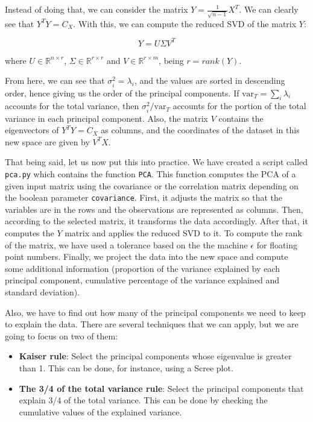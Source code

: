 \documentclass[11pt,a4paper]{article}
\begin{document}
Instead of doing that, we can consider the matrix $Y = \frac{1}{\sqrt{n-1}}X^T$. We can clearly see that
$Y^T Y = C_X$. With this, we can compute the reduced SVD of the matrix $Y$:

\[
  Y = U \Sigma V^T
\]

where $U \in \mathbb{R}^{n \times r}$, $\Sigma \in \mathbb{R}^{r \times r}$ and $V \in \mathbb{R}^{r \times m}$,
being $r = rank(Y)$.

From here, we can see that $\sigma_i^2 = \lambda_i$, and the values are sorted in descending order, hence giving
us the order of the principal components. If $\text{var}_T = \sum_i \lambda_i$ accounts for the total variance,
then $\sigma_i^2 / \text{var}_T$ accounts for the portion of the total variance in each principal component.
Also, the matrix $V$ contains the eigenvectors of $Y^T Y = C_X$ as columns, and the coordinates of the dataset
in this new space are given by $V^T X$.

That being said, let us now put this into practice. We have created a script called \texttt{pca.py} which
contains the function \texttt{PCA}. This function computes the PCA of a given input matrix using the covariance
or the correlation matrix depending on the boolean parameter \texttt{covariance}. First, it adjusts the matrix
so that the variables are in the rows and the observations are represented as columns. Then, according to the
selected matrix, it transforms the data accordingly. After that, it computes the $Y$ matrix and applies the
reduced SVD to it. To compute the rank of the matrix, we have used a tolerance based on the the machine $\epsilon$
for floating point numbers. Finally, we project the data into the new space and compute some additional
information (proportion of the variance explained by each principal component, cumulative percentage of the
variance explained and standard deviation).

Also, we have to find out how many of the principal components we need to keep to explain the data. There are
several techniques that we can apply, but we are going to focus on two of them:

\begin{itemize}
  \item \textbf{Kaiser rule}: Select the principal components whose eigenvalue is greater than 1. This can
  be done, for instance, using a Scree plot.
  \item \textbf{The 3/4 of the total variance rule}: Select the principal components that explain 3/4 of the
  total variance. This can be done by checking the cumulative values of the explained variance.
\end{itemize}
\end{document}
